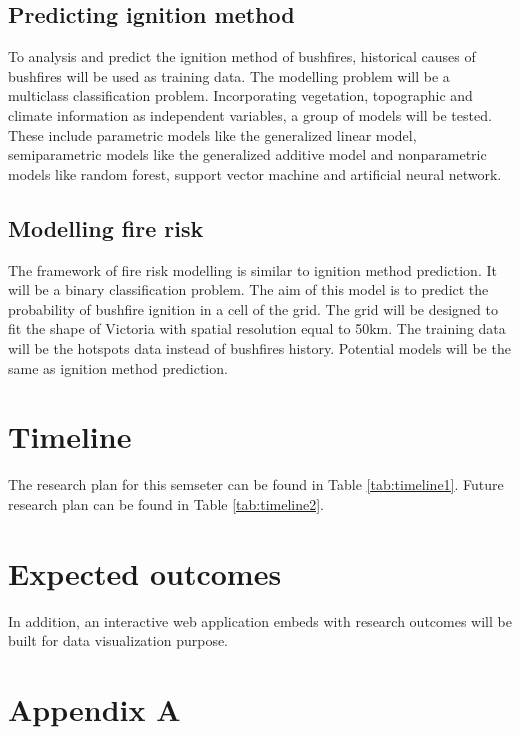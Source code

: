 \documentclass[11pt,a4paper,]{article}
\begin{document}
\subsection{Predicting ignition
method}\label{predicting-ignition-method}

To analysis and predict the ignition method of bushfires, historical
causes of bushfires will be used as training data. The modelling problem
will be a multiclass classification problem. Incorporating vegetation,
topographic and climate information as independent variables, a group of
models will be tested. These include parametric models like the
generalized linear model, semiparametric models like the generalized
additive model and nonparametric models like random forest, support
vector machine and artificial neural network.

\subsection{Modelling fire risk}\label{modelling-fire-risk}

The framework of fire risk modelling is similar to ignition method
prediction. It will be a binary classification problem. The aim of this
model is to predict the probability of bushfire ignition in a cell of
the grid. The grid will be designed to fit the shape of Victoria with
spatial resolution equal to 50km. The training data will be the hotspots
data instead of bushfires history. Potential models will be the same as
ignition method prediction.

\section{Timeline}\label{timeline}

The research plan for this semseter can be found in Table
\ref{tab:timeline1}. Future research plan can be found in Table
\ref{tab:timeline2}.

\section{Expected outcomes}\label{expected-outcomes}

In addition, an interactive web application embeds with research
outcomes will be built for data visualization purpose.

\newpage

\section*{Appendix A}\label{appendix-a}
\end{document}
